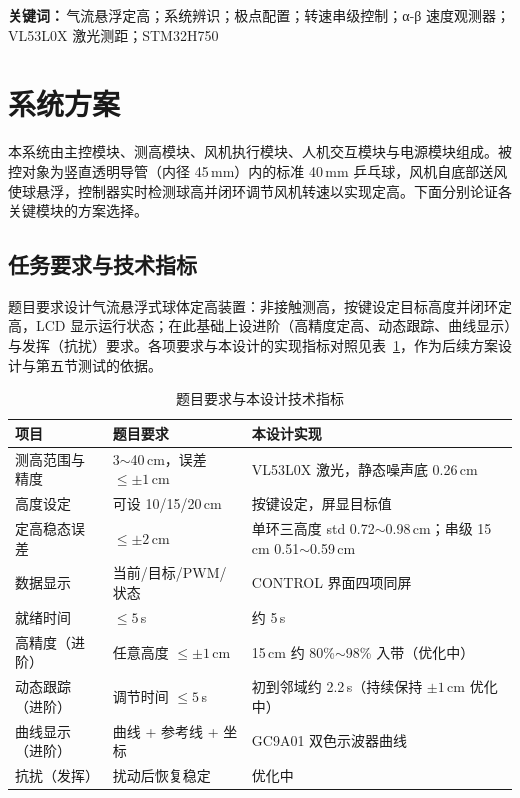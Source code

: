 \documentclass[12pt,a4paper]{ctexart}
\begin{document}
\vspace{0.4cm}
\noindent\textbf{关键词：}\,气流悬浮定高；系统辨识；极点配置；转速串级控制；α-β 速度观测器；VL53L0X 激光测距；STM32H750

\newpage
\tableofcontents
\newpage

\section{系统方案}

本系统由主控模块、测高模块、风机执行模块、人机交互模块与电源模块组成。被控对象为竖直透明导管（内径 45\,mm）内的标准 40\,mm 乒乓球，风机自底部送风使球悬浮，控制器实时检测球高并闭环调节风机转速以实现定高。下面分别论证各关键模块的方案选择。

\subsection{任务要求与技术指标}
题目要求设计气流悬浮式球体定高装置：非接触测高，按键设定目标高度并闭环定高，LCD 显示运行状态；在此基础上设进阶（高精度定高、动态跟踪、曲线显示）与发挥（抗扰）要求。各项要求与本设计的实现指标对照见表~\ref{tab:spec}，作为后续方案设计与第五节测试的依据。

\begin{table}[H]
\centering
\caption{题目要求与本设计技术指标}
\label{tab:spec}
\begin{tabular}{p{2.9cm} p{4.4cm} p{5.4cm}}
\toprule
项目 & 题目要求 & 本设计实现 \\
\midrule
测高范围与精度 & 3$\sim$40\,cm，误差 $\le\pm1$\,cm & VL53L0X 激光，静态噪声底 0.26\,cm \\
高度设定 & 可设 10/15/20\,cm & 按键设定，屏显目标值 \\
定高稳态误差 & $\le\pm2$\,cm & 单环三高度 std 0.72$\sim$0.98\,cm；串级 15\,cm 0.51$\sim$0.59\,cm \\
数据显示 & 当前/目标/PWM/状态 & CONTROL 界面四项同屏 \\
就绪时间 & $\le5$\,s & 约 5\,s \\
高精度（进阶） & 任意高度 $\le\pm1$\,cm & 15\,cm 约 80\%$\sim$98\% 入带（优化中） \\
动态跟踪（进阶） & 调节时间 $\le5$\,s & 初到邻域约 2.2\,s（持续保持 $\pm1$\,cm 优化中） \\
曲线显示（进阶） & 曲线 + 参考线 + 坐标 & GC9A01 双色示波器曲线 \\
抗扰（发挥） & 扰动后恢复稳定 & 优化中 \\
\bottomrule
\end{tabular}
\end{table}
\end{document}
